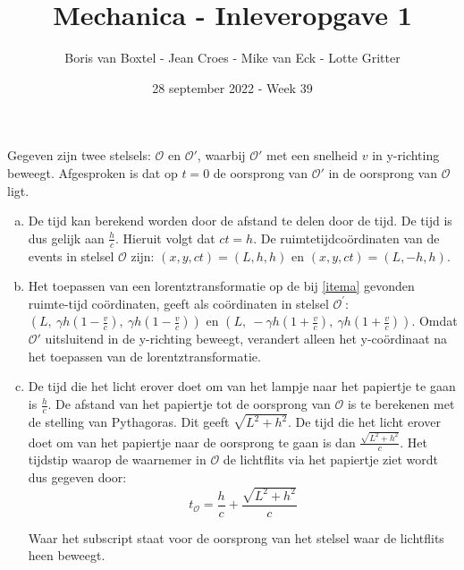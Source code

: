 \documentclass[12pt, dutch, a4paper]{article}
\begin{document}
\title{Mechanica - Inleveropgave 1}
\author{Boris van Boxtel - Jean Croes - Mike van Eck - Lotte Gritter}
\date{28 september 2022 - Week 39}

\maketitle
{}

Gegeven zijn twee stelsels: $\mathcal{O}$ en $\mathcal{O'}$, waarbij $\mathcal{O'}$ met een snelheid $v$
in y-richting beweegt. Afgesproken is dat op $t=0$ de oorsprong van $\mathcal{O'}$ in de oorsprong 
van $\mathcal{O}$ ligt.
\bigskip

\begin{enumerate}[(a).]
    \item \label{itema} 
    De tijd kan berekend worden door de afstand te delen door de tijd. 
    De tijd is dus gelijk aan $\frac{h}{c}$. Hieruit volgt dat $ct=h$.
    De ruimtetijdcoördinaten van de events in stelsel $\mathcal{O}$ zijn:
    $(x,y, ct) = (L ,h ,h)$ en $(x,y, ct) = (L ,-h ,h)$.

    \item
    Het toepassen van een lorentztransformatie op de bij \ref{itema} 
    gevonden ruimte-tijd coördinaten, 
    geeft als coördinaten in stelsel $\mathcal{O}^{'}$:
    $(L,\: \gamma h(1-\frac{v}{c}),\: \gamma h(1-\frac{v}{c}))$ en 
    $(L, \:-\gamma h(1+\frac{v}{c}), \: \gamma h(1+\frac{v}{c}))$. 
    Omdat $\mathcal{O}'$ uitsluitend in de y-richting beweegt,
    verandert alleen het y-coördinaat na het toepassen van de lorentztransformatie.  

    \item \label{itemc}
    De tijd die het licht erover doet om van het lampje naar het papiertje 
    te gaan is $\frac{h}{c}$. 
    De afstand van het papiertje tot de oorsprong van $\mathcal{O}$ is te
    berekenen met de stelling van Pythagoras. Dit geeft $\sqrt{L^2 + h^2}$.
    De tijd die het licht erover doet om van het papiertje 
    naar de oorsprong te gaan is dan $\frac{\sqrt{L^2 + h^2}}{c}$. 
    Het tijdstip waarop de waarnemer in $\mathcal{O}$ de lichtflits via 
    het papiertje ziet wordt dus gegeven door: 
    \begin{equation} \label{tijdinO} 
        t_{\mathcal{O}} = \frac{h}{c} + \frac{\sqrt{L^2 + h^2}}{c} 
    \end{equation}

    Waar het subscript staat voor de oorsprong van het stelsel 
    waar de lichtflits heen beweegt.


\end{enumerate}
\end{document}
